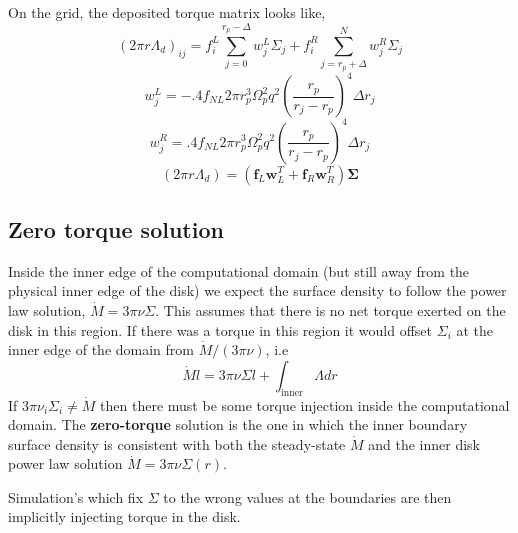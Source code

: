 \documentclass{article}
\begin{document}
On the grid, the deposited torque matrix looks like,
\begin{equation}
(2 \pi r \Lambda_d)_{ij} = f_i^L \sum_{j=0}^{r_p-\Delta } w_j^L \Sigma_j + f_i^R \sum_{j=r_p+\Delta}^N w_j^R \Sigma_j
\end{equation}
\begin{equation}
w_j^L = -.4 f_{NL} 2 \pi r_p^3 \Omega_p^2 q^2  \left( \frac{r_p}{r_j - r_p} \right)^4 \Delta r_j
\end{equation}
\begin{equation}
w_j^R=  .4 f_{NL} 2 \pi r_p^3 \Omega_p^2 q^2  \left( \frac{r_p}{r_j - r_p} \right)^4 \Delta r_j
\end{equation}
\begin{equation}
(2 \pi r \Lambda_d) = (\mathbf{f}_L \mathbf{w}_L^T + \mathbf{f}_R \mathbf{w}_R^T ) \mathbf{\Sigma}
\end{equation}



\subsection{Zero torque solution}


Inside the inner edge of the computational domain (but still away from the physical inner edge of the disk) we expect the surface density to follow the power law solution, $\dot{M} = 3\pi \nu \Sigma$. This assumes that there is no net torque exerted on the disk in this region. If there was a torque in this region it would offset $\Sigma_i$ at the inner edge of the domain from $\dot{M}/(3 \pi \nu)$, i.e
\begin{equation}
\dot{M} l = 3 \pi \nu \Sigma l + \int_\text{inner} \Lambda dr 
\end{equation}
If $3 \pi \nu_i \Sigma_i \neq \dot{M}$ then there must be some torque injection inside the computational domain. The \textbf{zero-torque} solution is the one in which the inner boundary surface density is consistent with both the steady-state $\dot{M}$ and the inner disk power law solution $ \dot{M} = 3 \pi \nu \Sigma(r)$. 

Simulation's which fix $\Sigma$ to the wrong values at the boundaries are then implicitly injecting torque in the disk. 
\end{document}
